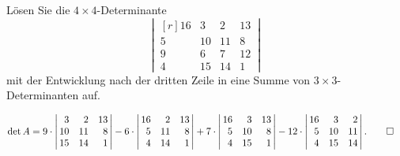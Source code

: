 Lösen Sie die $4\times 4$-Determinante
\[
\left|\,\begin{matrix*}[r]
 16 &  3 &  2 & 13 \\
  5 & 10 & 11 &  8 \\
  9 &  6 &  7 & 12 \\
  4 & 15 & 14 &  1
\end{matrix*}\,\right|
\]
mit der Entwicklung nach der dritten Zeile in eine Summe von
$3\times 3$-Determinanten auf.

\begin{loesung}
\begin{align*}
\det A
&=
9\cdot
\left|\,\begin{matrix*}[r]
  3 &  2 & 13 \\
 10 & 11 &  8 \\
 15 & 14 &  1
\end{matrix*}\,\right|
-
6\cdot
\left|\,\begin{matrix*}[r]
 16 &  2 & 13 \\
  5 & 11 &  8 \\
  4 & 14 &  1
\end{matrix*}\,\right|
+
7\cdot
\left|\,\begin{matrix*}[r]
 16 &  3 & 13 \\
  5 & 10 &  8 \\
  4 & 15 &  1
\end{matrix*}\,\right|
-
12\cdot
\left|\,\begin{matrix*}[r]
 16 &  3 &  2 \\
  5 & 10 & 11 \\
  4 & 15 & 14 
\end{matrix*}\,\right|.
\qedhere
\end{align*}
\end{loesung}

